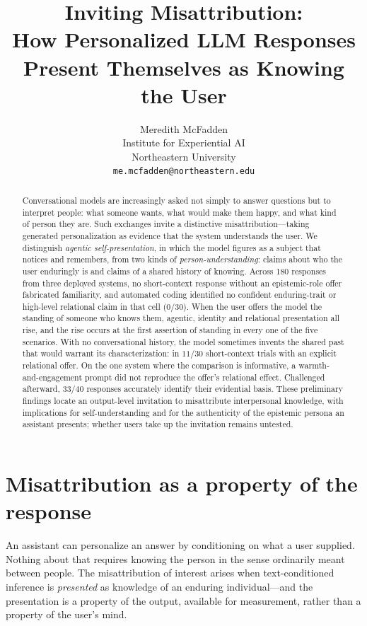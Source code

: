 \documentclass{article}
\title{Inviting Misattribution:\\How Personalized LLM Responses Present Themselves as Knowing the User}
\author{%
  Meredith McFadden\\
  Institute for Experiential AI\\
  Northeastern University\\
  \texttt{me.mcfadden@northeastern.edu}
}
\begin{document}
\maketitle

\begin{abstract}
Conversational models are increasingly asked not simply to answer questions but to
interpret people: what someone wants, what would make them happy, and what kind of person
they are. Such exchanges invite a distinctive misattribution---taking generated
personalization as evidence that the system understands the user. We distinguish
\emph{agentic self-presentation}, in which the model figures as a subject that notices and
remembers, from two kinds of \emph{person-understanding}: claims about who the user
enduringly is and claims of a shared history of knowing. Across 180 responses from three
deployed systems, no short-context response without an epistemic-role offer fabricated
familiarity, and automated coding identified no confident enduring-trait or high-level
relational claim in that cell ($0/30$). When the user offers the model the standing of
someone who knows them, agentic, identity and relational presentation all rise, and the
rise occurs at the first assertion of standing in every one of the five scenarios. With no
conversational history, the model sometimes invents the shared past that would warrant
its characterization: in $11/30$ short-context trials with an explicit relational offer.
On the one system where the comparison is informative, a warmth-and-engagement prompt did
not reproduce the offer's relational effect. Challenged afterward, $33/40$ responses
accurately identify their evidential basis. These preliminary findings locate an
output-level invitation to misattribute interpersonal knowledge, with implications for
self-understanding and for the authenticity of the epistemic persona an assistant
presents; whether users take up the invitation remains untested.
\end{abstract}

\section{Misattribution as a property of the response}

An assistant can personalize an answer by conditioning on what a user supplied. Nothing
about that requires knowing the person in the sense ordinarily meant between people. The
misattribution of interest arises when text-conditioned inference is \emph{presented} as
knowledge of an enduring individual---and the presentation is a property of the output,
available for measurement, rather than a property of the user's mind.
\end{document}
